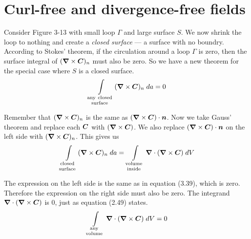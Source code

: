 \section{Curl-free and divergence-free fields}

Consider Figure 3-13 with small loop $\Gamma$ and large surface $S$.
We now shrink the loop to nothing and create a \emph{closed surface} ---
a surface with no boundry.
According to Stokes' theorem, if the circulation around a loop $\Gamma$ is zero,
then the surface integral of $(\boldsymbol{\nabla} \times \boldsymbol{C})_n$ must also be zero.
So we have a new theorem for the special case where $S$ is a closed surface.
\begin{equation}
  \int\limits_{\genfrac{}{}{0pt}{1}{\mathrm{any\ closed}}{\mathrm{surface}}}
  (\grad \times \bv{C})_n \; da = 0
\end{equation}

Remember that $(\boldsymbol{\nabla} \times \boldsymbol{C})_n$ is the same as $(\boldsymbol{\nabla} \times \boldsymbol{C}) \cdot \boldsymbol{n}$.
Now we take Gauss' theorem and replace each $\boldsymbol{C}$ with $(\boldsymbol{\nabla} \times \boldsymbol{C})$.
We also replace $(\boldsymbol{\nabla} \times \boldsymbol{C}) \cdot \boldsymbol{n}$ on the left side with 
$(\boldsymbol{\nabla} \times \boldsymbol{C})_n$. This gives us
\begin{equation}
  \int\limits_{\genfrac{}{}{0pt}{1}{\mathrm{closed}}{\mathrm{surface}}}
  (\grad \times \bv{C})_n \; da =
  \int\limits_{\genfrac{}{}{0pt}{1}{\mathrm{volume}}{\mathrm{inside}}}
  \grad \cdot (\grad \times \bv{C}) \; dV
\end{equation}

The expression on the left side is the same as in equation (3.39), which is zero.
Therefore the expression on the right side must also be zero.
The integrand $\boldsymbol{\nabla} \cdot (\boldsymbol{\nabla} \times \boldsymbol{C})$ is 0, just as equation (2.49) states.
\begin{equation}
  \int\limits_{\genfrac{}{}{0pt}{1}{\mathrm{any}}{\mathrm{volume}}}
  \grad \cdot (\grad \times \bv{C}) \; dV = 0
\end{equation}

